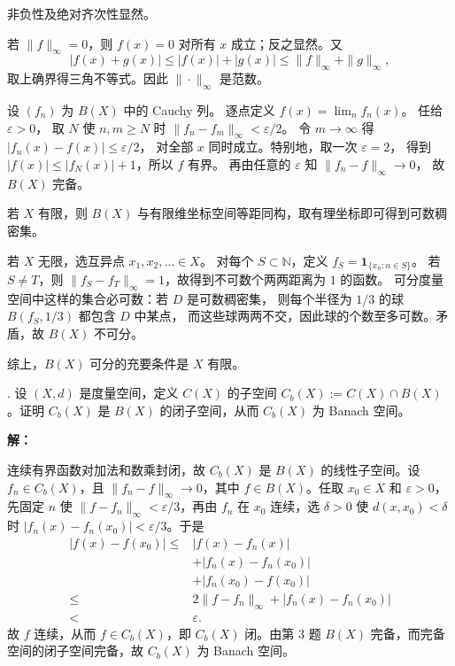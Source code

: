 \documentclass{article}
\begin{document}
非负性及绝对齐次性显然。

若 $\|f\|_\infty=0$，则 $f(x)=0$ 对所有 $x$ 成立；反之显然。又
\[
|f(x)+g(x)|\le|f(x)|+|g(x)|\le\|f\|_\infty+\|g\|_\infty,
\]
取上确界得三角不等式。因此 $\|\cdot\|_\infty$ 是范数。

设 $(f_n)$ 为 $B(X)$ 中的 Cauchy 列。
逐点定义 $f(x)=\lim_n f_n(x)$。
任给 $\varepsilon>0$，
取 $N$ 使 $n,m\ge N$ 时 $\|f_n-f_m\|_\infty<\varepsilon/2$。
令 $m\to\infty$ 得 $|f_n(x)-f(x)|\le\varepsilon/2$，
对全部 $x$ 同时成立。特别地，取一次 $\varepsilon=2$，
得到 $|f(x)|\le|f_N(x)|+1$，所以 $f$ 有界。
再由任意的 $\varepsilon$ 知 $\|f_n-f\|_\infty\to0$，
故 $B(X)$ 完备。


若 $X$ 有限，则 $B(X)$ 与有限维坐标空间等距同构，取有理坐标即可得到可数稠密集。

若 $X$ 无限，选互异点 $x_1,x_2,\ldots\in X$。
对每个 $S\subset\mathbb N$，定义 $f_S=\mathbf1_{\{x_n:n\in S\}}$。
若 $S\ne T$，则 $\|f_S-f_T\|_\infty=1$，故得到不可数个两两距离为 $1$ 的函数。
可分度量空间中这样的集合必可数：若 $D$ 是可数稠密集，
则每个半径为 $1/3$ 的球 $B(f_S,1/3)$ 都包含 $D$ 中某点，
而这些球两两不交，因此球的个数至多可数。矛盾，故 $B(X)$ 不可分。

综上，$B(X)$ 可分的充要条件是 $X$ 有限。



\par\medskip

\par\medskip{}. 设 $(X,d)$ 是度量空间，定义 $C(X)$ 的子空间 $C_b(X):=C(X)\cap B(X)$。证明 $C_b(X)$ 是 $B(X)$ 的闭子空间，从而 $C_b(X)$ 为 Banach 空间。


\par{}\noindent\textbf{解：}\par\nopagebreak[4]


连续有界函数对加法和数乘封闭，故 $C_b(X)$ 是 $B(X)$ 的线性子空间。设 $f_n\in C_b(X)$，且 $\|f_n-f\|_\infty\to0$，其中 $f\in B(X)$。任取 $x_0\in X$ 和 $\varepsilon>0$，先固定 $n$ 使 $\|f-f_n\|_\infty<\varepsilon/3$，再由 $f_n$ 在 $x_0$ 连续，选 $\delta>0$ 使 $d(x,x_0)<\delta$ 时 $|f_n(x)-f_n(x_0)|<\varepsilon/3$。于是
\[
\begin{aligned}
|f(x)-f(x_0)|
\le{}&|f(x)-f_n(x)|\\
&+|f_n(x)-f_n(x_0)|\\
&+|f_n(x_0)-f(x_0)|\\
\le{}&2\|f-f_n\|_\infty+|f_n(x)-f_n(x_0)|\\
<{}&\varepsilon.
\end{aligned}
\]
故 $f$ 连续，从而 $f\in C_b(X)$，即 $C_b(X)$ 闭。由第 3 题 $B(X)$ 完备，而完备空间的闭子空间完备，故 $C_b(X)$ 为 Banach 空间。
\end{document}
